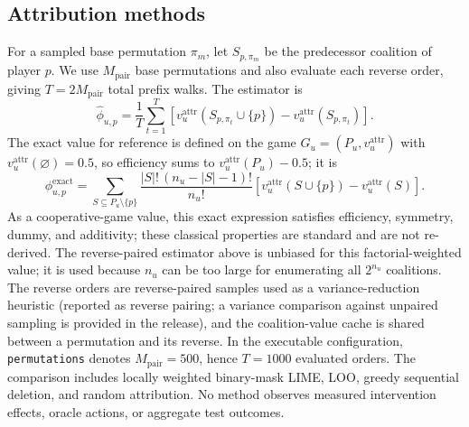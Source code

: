 \documentclass[pdflatex,sn-mathphys-num]{sn-jnl}
\theoremstyle{thmstyleone}
\theoremstyle{thmstyletwo}
\theoremstyle{thmstylethree}
\begin{document}
\subsection{Attribution methods}
For a sampled base permutation $\pi_m$, let $S_{p,\pi_m}$ be the predecessor coalition of player $p$. We use $M_{\mathrm{pair}}$ base permutations and also evaluate each reverse order, giving $T=2M_{\mathrm{pair}}$ total prefix walks. The estimator is
\begin{equation}
\widehat\phi_{u,p}=\frac{1}{T}\sum_{t=1}^{T}\left[v_u^{\mathrm{attr}}(S_{p,\pi_t}\cup\{p\})-v_u^{\mathrm{attr}}(S_{p,\pi_t})\right].
\end{equation}
The exact value for reference is defined on the game $G_u=(P_u,v_u^{\mathrm{attr}})$ with $v_u^{\mathrm{attr}}(\varnothing)=0.5$, so efficiency sums to $v_u^{\mathrm{attr}}(P_u)-0.5$; it is
\begin{equation}
\phi^{\mathrm{exact}}_{u,p}=
\sum_{S\subseteq P_u\setminus\{p\}}
\frac{|S|!\,(n_u-|S|-1)!}{n_u!}
\left[v_u^{\mathrm{attr}}(S\cup\{p\})-v_u^{\mathrm{attr}}(S)\right].
\label{eq:exact-shapley}
\end{equation}
As a cooperative-game value, this exact expression satisfies efficiency, symmetry, dummy, and additivity; these classical properties are standard and are not re-derived. The reverse-paired estimator above is unbiased for this factorial-weighted value; it is used because $n_u$ can be too large for enumerating all $2^{n_u}$ coalitions. The reverse orders are reverse-paired samples used as a variance-reduction heuristic (reported as reverse pairing; a variance comparison against unpaired sampling is provided in the release), and the coalition-value cache is shared between a permutation and its reverse. In the executable configuration, \texttt{permutations} denotes $M_{\mathrm{pair}}=500$, hence $T=1000$ evaluated orders. The comparison includes locally weighted binary-mask LIME, LOO, greedy sequential deletion, and random attribution. No method observes measured intervention effects, oracle actions, or aggregate test outcomes.
\end{document}
